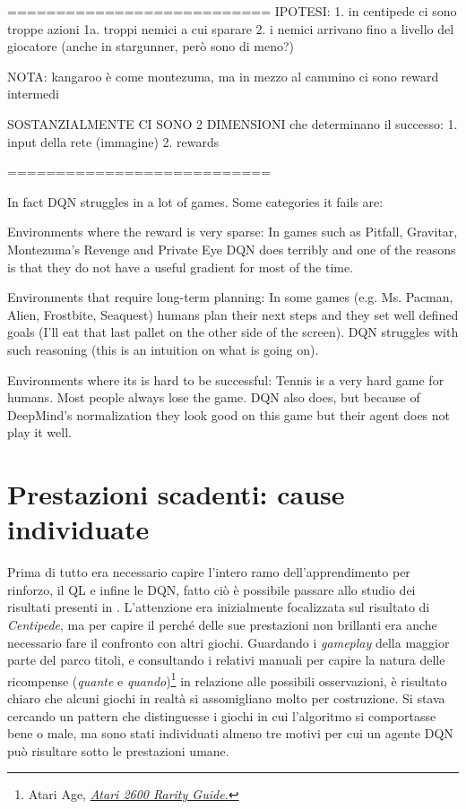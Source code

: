 \documentclass[twoside,twocolumn,10pt]{extarticle}
\theoremstyle{definition}
\begin{document}
	
	
	===========================
	IPOTESI: 1. in centipede ci sono troppe azioni
			 	1a. troppi nemici a cui sparare
		     2. i nemici arrivano fino a livello del giocatore 
		     		(anche in stargunner, però sono di meno?)
		     		
	NOTA:
			kangaroo è come montezuma, ma in mezzo al cammino ci sono reward intermedi
			
	SOSTANZIALMENTE CI SONO 2 DIMENSIONI che determinano il successo:
		1. input della rete (immagine)
		2. rewards
	
	
	===========================
	
	In fact DQN struggles in a lot of games. Some categories it fails are:
	
	Environments where the reward is very sparse: In games such as Pitfall, Gravitar, Montezuma's Revenge and Private Eye DQN does terribly and one of the reasons is that they do not have a useful gradient for most of the time.
	
	Environments that require long-term planning: In some games (e.g. Ms. Pacman, Alien, Frostbite, Seaquest) humans plan their next steps and they set well defined goals (I'll eat that last pallet on the other side of the screen). DQN struggles with such reasoning (this is an intuition on what is going on).
	
	Environments where its is hard to be successful: Tennis is a very hard game for humans. Most people always lose the game. DQN also does, but because of DeepMind's normalization they look good on this game but their agent does not play it well.
	
\section{Prestazioni scadenti: cause individuate}
	Prima di tutto era necessario capire l'intero ramo dell'apprendimento per rinforzo, il QL e infine le DQN, fatto ciò è possibile passare allo studio dei risultati presenti in \cite{bib:dqn}. L'attenzione era inizialmente focalizzata sul risultato di \textit{Centipede}, ma per capire il perché delle sue prestazioni non brillanti era anche necessario fare il confronto con altri giochi. Guardando i \textit{gameplay} della maggior parte del parco titoli, e consultando i relativi manuali per capire la natura delle ricompense (\textit{quante} e \textit{quando})\footnote{Atari Age, \emph{\href{https://atariage.com/software_search.php?SystemID=2600}{Atari 2600 Rarity Guide.}}} in relazione alle possibili osservazioni, è risultato chiaro che alcuni giochi in realtà si assomigliano molto per costruzione. Si stava cercando un pattern che distinguesse i giochi in cui l'algoritmo si comportasse bene o male, ma sono stati individuati almeno tre motivi per cui un agente DQN può risultare sotto le prestazioni umane.
\end{document}

